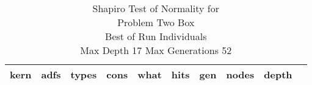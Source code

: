 \begin{table}[H]
\caption{Shapiro Test of Normality for \\ Problem  Two Box \\Best of Run Individuals \\ Max Depth 17 Max Generations 52\\}
\begin{center}
\scalebox{0.8} %
{
\begin{tabular}{lrrrrrrrrr}
\hline
kern & adfs & types & cons & what & hits & gen & nodes & depth \\
\hline


\end{tabular}
}
\end{center}
\end{table}

